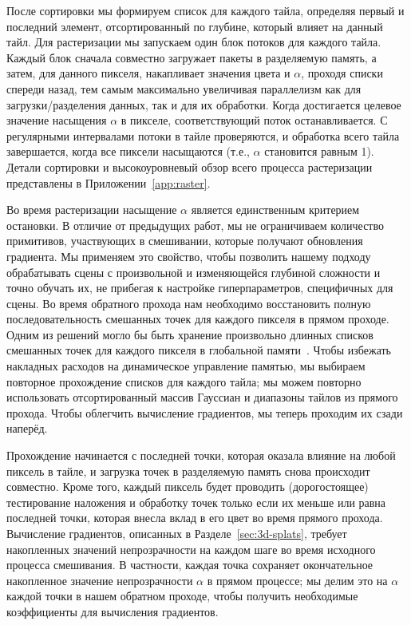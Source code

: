 После сортировки  мы формируем список для каждого тайла, определяя первый и последний элемент, отсортированный по глубине, который влияет на данный тайл. Для растеризации мы запускаем один блок потоков для каждого тайла. Каждый блок сначала совместно загружает пакеты  в разделяемую память, а затем, для данного пикселя, накапливает значения цвета и $\alpha$, проходя списки спереди назад, тем самым максимально увеличивая параллелизм как для загрузки/разделения данных, так и для их обработки.
Когда достигается целевое значение насыщения $\alpha$ в пикселе, соответствующий поток останавливается. С регулярными интервалами потоки в тайле проверяются, и обработка всего тайла завершается, когда все пиксели насыщаются (т.е., $\alpha$ становится равным 1). %
Детали сортировки и высокоуровневый обзор всего процесса растеризации представлены в Приложении~\ref{app:raster}.

Во время растеризации насыщение $\alpha$ является единственным критерием остановки. В отличие от предыдущих работ, мы не ограничиваем количество примитивов, участвующих в смешивании, которые получают обновления градиента. Мы применяем это свойство, чтобы позволить нашему подходу обрабатывать сцены с произвольной и изменяющейся глубиной сложности и точно обучать их, не прибегая к настройке гиперпараметров, специфичных для сцены.
Во время обратного прохода нам необходимо восстановить полную последовательность смешанных точек для каждого пикселя в прямом проходе. Одним из решений могло бы быть хранение произвольно длинных списков смешанных точек для каждого пикселя в глобальной памяти~\cite{kopanas21}. Чтобы избежать накладных расходов на динамическое управление памятью, мы выбираем повторное прохождение списков для каждого тайла; мы можем повторно использовать отсортированный массив Гауссиан и диапазоны тайлов из прямого прохода. Чтобы облегчить вычисление градиентов, мы теперь проходим их сзади наперёд.

Прохождение начинается с последней точки, которая оказала влияние на любой пиксель в тайле, и загрузка точек в разделяемую память снова происходит совместно. Кроме того, каждый пиксель будет проводить (дорогостоящее) тестирование наложения и обработку точек только если их  меньше или равна  последней точки, которая внесла вклад в его цвет во время прямого прохода.
Вычисление градиентов, описанных в Разделе~\ref{sec:3d-splats}, требует накопленных значений непрозрачности на каждом шаге во время исходного процесса смешивания.
В частности, каждая точка сохраняет окончательное накопленное значение непрозрачности $\alpha$ в прямом процессе; мы делим это на $\alpha$ каждой точки в нашем обратном проходе, чтобы получить необходимые коэффициенты для вычисления градиентов.
